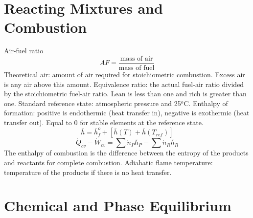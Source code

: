 \documentclass[paper=letter, fontsize=11pt]{scrartcl}
\numberwithin{equation}{section}        %
\numberwithin{figure}{section}          %
\numberwithin{table}{section}               %
\begin{document}
\newpage
\section{Reacting Mixtures and Combustion}

Air-fuel ratio
\begin{equation}
    AF = \frac{\text{mass of air}}{\text{mass of fuel}}
\end{equation}
\newline
\newline
Theoretical air: amount of air required for stoichiometric combustion. Excess air is any air above this amount.
\newline
\newline
Equivalence ratio: the actual fuel-air ratio divided by the stoichiometric fuel-air ratio. Lean is less than one and rich is greater than one.
\newline
\newline
Standard reference state: atmospheric pressure and 25$^o$C.
\newline
\newline
Enthalpy of formation: positive is endothermic (heat transfer in), negative is exothermic (heat transfer out). Equal to 0 for stable elements at the reference state.
\begin{equation}
    \bar h = \bar h^o_f + [\bar h(T) + \bar h (T_{ref})]
\end{equation}
\newline
\newline
\begin{equation}
    \dot Q_{cv} - \dot W_{cv} = \sum \dot n_P \bar h_P - \sum \dot n_R \bar h_R
\end{equation}
\newline
\newline
The enthalpy of combustion is the difference between the entropy of the products and reactants for complete combustion.
\newline
\newline
Adiabatic flame temperature: temperature of the products if there is no heat transfer.


\newpage
\section{Chemical and Phase Equilibrium}
\end{document}
